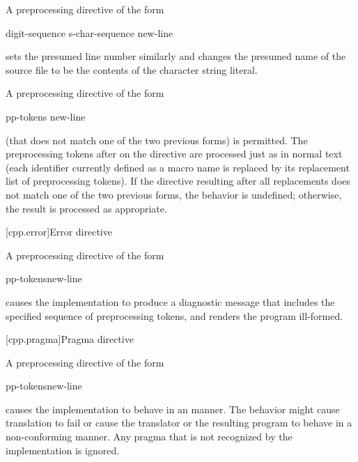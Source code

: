 \pnum
A preprocessing directive of the form

\begin{ncsimplebnf}
 digit-sequence  s-char-sequence\opt {} new-line
\end{ncsimplebnf}

sets the presumed line number similarly and changes the
presumed name of the source file to be the contents
of the character string literal.

\pnum
A preprocessing directive of the form

\begin{ncsimplebnf}
 pp-tokens new-line
\end{ncsimplebnf}

(that does not match one of the two previous forms)
is permitted.
The preprocessing tokens after
on the directive are processed just as in normal text
(each identifier currently defined as a macro name is replaced by its
replacement list of preprocessing tokens).
If the directive resulting after all replacements does not match
one of the two previous forms, the behavior is undefined;
otherwise, the result is processed as appropriate.

[cpp.error]{Error directive}%
%

\pnum
A preprocessing directive of the form

\begin{ncsimplebnf}
 pp-tokens\opt new-line
\end{ncsimplebnf}

causes the implementation to produce
a diagnostic message that includes the specified sequence of preprocessing tokens,
and renders the program ill-formed.

[cpp.pragma]{Pragma directive}%
%

\pnum
A preprocessing directive of the form

\begin{ncsimplebnf}
 pp-tokens\opt new-line
\end{ncsimplebnf}

causes the implementation to behave
in an  manner.
The behavior might cause translation to fail or cause the translator or
the resulting program to behave in a non-conforming manner.
Any pragma that is not recognized by the implementation is ignored.

